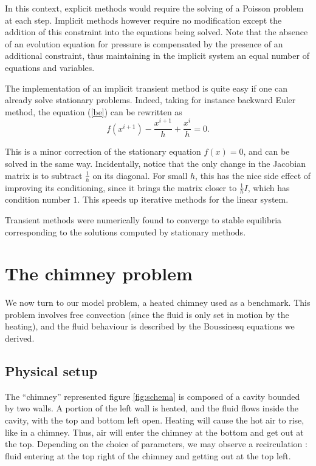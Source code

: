 \documentclass[12pt]{article}
\begin{document}
In this context, explicit methods would require the solving of a
Poisson problem at each step. Implicit methods however require no
modification except the addition of this constraint into the equations
being solved. Note that the absence of an evolution equation for
pressure is compensated by the presence of an additional constraint,
thus maintaining in the implicit system an equal number of equations
and variables.

The implementation of an implicit transient method is quite easy if
one can already solve stationary problems. Indeed, taking for instance
backward Euler method, the equation (\ref{be}) can be rewritten
as
$$f(x^{i+1}) - \frac{x^{i+1}}{h} + \frac{x^i}{h} = 0.$$

This is a minor correction of the stationary equation $f(x) = 0$, and
can be solved in the same way. Incidentally, notice that the only
change in the Jacobian matrix is to subtract $\frac{1}{h}$ on its
diagonal. For small $h$, this has the nice side effect of improving
its conditioning, since it brings the matrix closer to $\frac{1}{h}
I$, which has condition number $1$. This speeds up iterative methods
for the linear system.

Transient methods were numerically found to converge to stable
equilibria corresponding to the solutions computed by stationary
methods.
\section{The chimney problem}
We now turn to our model problem, a heated chimney used as a
benchmark. This problem involves free convection (since the fluid is
only set in motion by the heating), and the fluid behaviour is
described by the Boussinesq equations we derived.
\subsection{Physical setup}
The ``chimney'' represented figure \ref{fig:schema} is composed of a
cavity bounded by two walls. A portion of the left wall is heated, and
the fluid flows inside the cavity, with the top and bottom left
open. Heating will cause the hot air to rise, like in a chimney. Thus,
air will enter the chimney at the bottom and get out at the
top. Depending on the choice of parameters, we may observe a
recirculation : fluid entering at the top right of the chimney and
getting out at the top left.
\end{document}
